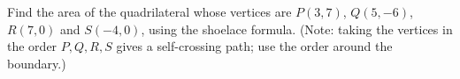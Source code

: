 Find the area of the quadrilateral whose vertices are $P(3,7)$, $Q(5,-6)$, $R(7,0)$ and $S(-4,0)$, using the shoelace formula. (Note: taking the vertices in the order $P,Q,R,S$ gives a self-crossing path; use the order around the boundary.)
